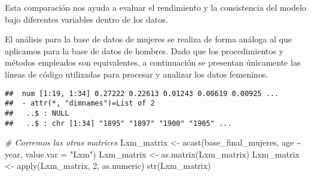 \documentclass[
]{article}
\newenvironment{Shaded}{\begin{snugshade}}{\end{snugshade}}
\newcommand{\AttributeTok}[1]{\textcolor[rgb]{0.77,0.63,0.00}{#1}}
\newcommand{\CommentTok}[1]{\textcolor[rgb]{0.56,0.35,0.01}{\textit{#1}}}
\newcommand{\DecValTok}[1]{\textcolor[rgb]{0.00,0.00,0.81}{#1}}
\newcommand{\FunctionTok}[1]{\textcolor[rgb]{0.00,0.00,0.00}{#1}}
\newcommand{\NormalTok}[1]{#1}
\newcommand{\OtherTok}[1]{\textcolor[rgb]{0.56,0.35,0.01}{#1}}
\newcommand{\SpecialCharTok}[1]{\textcolor[rgb]{0.00,0.00,0.00}{#1}}
\newcommand{\StringTok}[1]{\textcolor[rgb]{0.31,0.60,0.02}{#1}}
\begin{document}
Esta comparación nos ayuda a evaluar el rendimiento y la consistencia
del modelo bajo diferentes variables dentro de los datos.

El análisis para la base de datos de mujeres se realiza de forma análoga
al que aplicamos para la base de datos de hombres. Dado que los
procedimientos y métodos empleados son equivalentes, a continuación se
presentan únicamente las líneas de código utilizadas para procesar y
analizar los datos femeninos.

\begin{Shaded}
\end{Shaded}

\begin{verbatim}
##  num [1:19, 1:34] 0.27222 0.22613 0.01243 0.00619 0.00925 ...
##  - attr(*, "dimnames")=List of 2
##   ..$ : NULL
##   ..$ : chr [1:34] "1895" "1897" "1900" "1905" ...
\end{verbatim}

\begin{Shaded}
\begin{Highlighting}[]
\CommentTok{\# Corremos las otras matrices}
\NormalTok{Lxm\_matrix }\OtherTok{\textless{}{-}} \FunctionTok{acast}\NormalTok{(base\_final\_mujeres, age }\SpecialCharTok{\textasciitilde{}}\NormalTok{ year, }\AttributeTok{value.var =} \StringTok{"Lxm"}\NormalTok{)}
\NormalTok{Lxm\_matrix }\OtherTok{\textless{}{-}} \FunctionTok{as.matrix}\NormalTok{(Lxm\_matrix)}
\NormalTok{Lxm\_matrix }\OtherTok{\textless{}{-}} \FunctionTok{apply}\NormalTok{(Lxm\_matrix, }\DecValTok{2}\NormalTok{, as.numeric)}
\FunctionTok{str}\NormalTok{(Lxm\_matrix)}
\end{Highlighting}
\end{Shaded}
\end{document}
